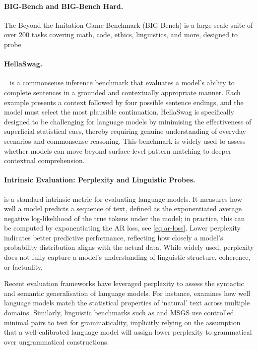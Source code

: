 \paragraph{BIG-Bench and BIG-Bench Hard.} The Beyond the Imitation Game Benchmark (BIG-Bench) \citep{suzgun2023bigbenchhard} is a large-scale suite of over 200 tasks covering math, code, ethics, linguistics, and more, designed to probe

\paragraph{HellaSwag.} ~\citep{zellers2019hellaswag} is a commonsense inference benchmark that evaluates a model's ability to complete sentences in a grounded and contextually appropriate manner. Each example presents a context followed by four possible sentence endings, and the model must select the most plausible continuation. HellaSwag is specifically designed to be challenging for language models by minimising the effectiveness of superficial statistical cues, thereby requiring genuine understanding of everyday scenarios and commonsense reasoning. This benchmark is widely used to assess whether models can move beyond surface-level pattern matching to deeper contextual comprehension.

\paragraph{Intrinsic Evaluation: Perplexity and Linguistic Probes.} 
 \citep{jelinek1977perplexity} is a standard intrinsic metric for evaluating language models. It measures how well a model predicts a sequence of text, defined as the exponentiated average negative log-likelihood of the true tokens under the model; in practice, this can be computed by exponentiating the AR loss, see \cref{eq:ar-loss}. Lower perplexity indicates better predictive performance, reflecting how closely a model's probability distribution aligns with the actual data. While widely used, perplexity does not fully capture a model's understanding of linguistic structure, coherence, or factuality.

Recent evaluation frameworks have leveraged perplexity to assess the syntactic and semantic generalisation of language models. For instance,  \citep{magnusson2024paloma} examines how well language models match the statistical properties of `natural' text across multiple domains. Similarly, linguistic benchmarks such as  and MSGS \citep{warstadt2020blimp, warstadt2020msgs} use controlled minimal pairs to test for grammaticality, implicitly relying on the assumption that a well-calibrated language model will assign lower perplexity to grammatical over ungrammatical constructions.

